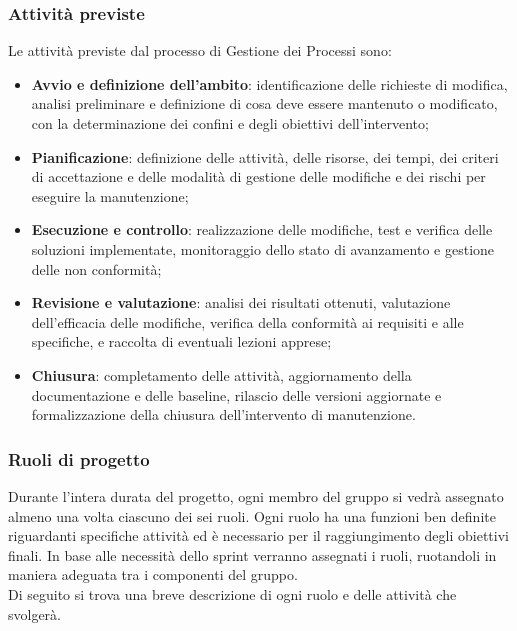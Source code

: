 \documentclass[a4paper,12pt]{article}
\begin{document}
        \subsubsection{Attività previste}
            Le attività previste dal processo di Gestione dei Processi sono:
            \begin{itemize}
                \item \textbf{Avvio e definizione dell'ambito}: identificazione delle richieste di modifica, analisi preliminare e definizione di cosa deve essere mantenuto o modificato, con la determinazione dei confini e degli obiettivi dell'intervento;
                \item \textbf{Pianificazione}: definizione delle attività, delle risorse, dei tempi, dei criteri di accettazione e delle modalità di gestione delle modifiche e dei rischi per eseguire la manutenzione;
                \item \textbf{Esecuzione e controllo}: realizzazione delle modifiche, test e verifica delle soluzioni implementate, monitoraggio dello stato di avanzamento e gestione delle non conformità;
                \item \textbf{Revisione e valutazione}: analisi dei risultati ottenuti, valutazione dell'efficacia delle modifiche, verifica della conformità ai requisiti e alle specifiche, e raccolta di eventuali lezioni apprese;
                \item \textbf{Chiusura}: completamento delle attività, aggiornamento della documentazione e delle baseline, rilascio delle versioni aggiornate e formalizzazione della chiusura dell'intervento di manutenzione.
            \end{itemize}

        \subsubsection{Ruoli di progetto}
            Durante l'intera durata del progetto, ogni membro del gruppo si vedrà assegnato almeno una volta ciascuno dei sei ruoli.
            Ogni ruolo ha una funzioni ben definite riguardanti specifiche attività ed è necessario per il raggiungimento degli obiettivi finali.
            In base alle necessità dello sprint verranno assegnati i ruoli, ruotandoli in maniera adeguata tra i componenti del gruppo.\\
            Di seguito si trova una breve descrizione di ogni ruolo e delle attività che svolgerà.
\end{document}
